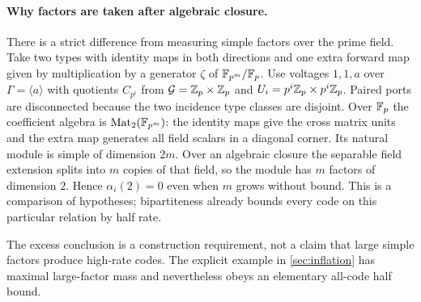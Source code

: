 \paragraph{Why factors are taken after algebraic closure.}
There is a strict difference from measuring simple factors over the
prime field. Take two types with identity maps in both directions
and one extra forward map given by multiplication by a generator
$\zeta$ of $\mathbb{F}_{p^m}/\mathbb{F}_p$. Use voltages $1,1,a$ over
$\Gamma=\langle a\rangle$ with quotients $C_{p^i}$ from
$\mathcal G=\mathbb{Z}_p\times\mathbb{Z}_p$ and
$U_i=p^i\mathbb{Z}_p\times p^i\mathbb{Z}_p$. Paired ports are disconnected
because the two incidence type classes are disjoint.
Over $\mathbb{F}_p$ the coefficient algebra is
$\operatorname{Mat}_2(\mathbb{F}_{p^m})$: the identity maps give the
cross matrix units and the extra map generates all field scalars
in a diagonal corner. Its natural module is simple of dimension $2m$.
Over an algebraic closure the separable field extension splits into
$m$ copies of that field, so the module has $m$ factors of dimension
$2$. Hence $\alpha_i(2)=0$ even when $m$ grows without bound.
This is a comparison of hypotheses; bipartiteness already bounds
every code on this particular relation by half rate.

The excess conclusion is a construction requirement, not a claim
that large simple factors produce high-rate codes. The explicit
example in \cref{sec:inflation} has maximal large-factor mass and
nevertheless obeys an elementary all-code half bound.
